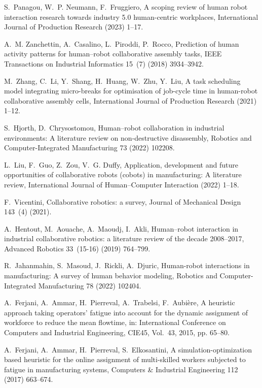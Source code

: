\documentclass[review,12pt, 3p, times]{elsarticle}
\begin{document}
\begin{thebibliography}{00}
S.~Panagou, W.~P. Neumann, F.~Fruggiero, A scoping review of human robot
  interaction research towards industry 5.0 human-centric workplaces,
  International Journal of Production Research (2023) 1--17.

A.~M. Zanchettin, A.~Casalino, L.~Piroddi, P.~Rocco, Prediction of human
  activity patterns for human--robot collaborative assembly tasks, IEEE
  Transactions on Industrial Informatics 15~(7) (2018) 3934--3942.

M.~Zhang, C.~Li, Y.~Shang, H.~Huang, W.~Zhu, Y.~Liu, A task scheduling model
  integrating micro-breaks for optimisation of job-cycle time in human-robot
  collaborative assembly cells, International Journal of Production Research
  (2021) 1--12.

S.~Hjorth, D.~Chrysostomou, Human--robot collaboration in industrial
  environments: A literature review on non-destructive disassembly, Robotics
  and Computer-Integrated Manufacturing 73 (2022) 102208.

L.~Liu, F.~Guo, Z.~Zou, V.~G. Duffy, Application, development and future
  opportunities of collaborative robots (cobots) in manufacturing: A literature
  review, International Journal of Human--Computer Interaction (2022) 1--18.

F.~Vicentini, Collaborative robotics: a survey, Journal of Mechanical Design
  143~(4) (2021).

A.~Hentout, M.~Aouache, A.~Maoudj, I.~Akli, Human--robot interaction in
  industrial collaborative robotics: a literature review of the decade
  2008--2017, Advanced Robotics 33~(15-16) (2019) 764--799.

R.~Jahanmahin, S.~Masoud, J.~Rickli, A.~Djuric, Human-robot interactions in
  manufacturing: {A} survey of human behavior modeling, Robotics and
  Computer-Integrated Manufacturing 78 (2022) 102404.

A.~Ferjani, A.~Ammar, H.~Pierreval, A.~Trabelsi, F.~Aubi{\`e}re, A heuristic
  approach taking operators’ fatigue into account for the dynamic assignment
  of workforce to reduce the mean flowtime, in: International Conference on
  Computers and Industrial Engineering, CIE45, Vol.~43, 2015, pp. 65--80.

A.~Ferjani, A.~Ammar, H.~Pierreval, S.~Elkosantini, A simulation-optimization
  based heuristic for the online assignment of multi-skilled workers subjected
  to fatigue in manufacturing systems, Computers \& Industrial Engineering 112
  (2017) 663--674.


\end{thebibliography}
\end{document}
